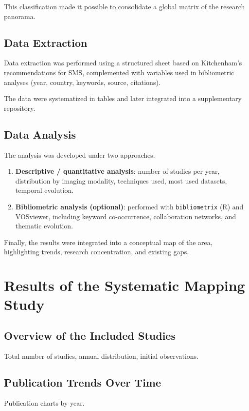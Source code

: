 This classification made it possible to consolidate a global matrix of the research panorama.

\subsection{Data Extraction}
Data extraction was performed using a structured sheet based on Kitchenham's recommendations for SMS, complemented with variables used in bibliometric analyses (year, country, keywords, source, citations).

The data were systematized in tables and later integrated into a supplementary repository.

\subsection{Data Analysis}
The analysis was developed under two approaches:

\begin{enumerate}
    \item \textbf{Descriptive / quantitative analysis}:
    number of studies per year, distribution by imaging modality, techniques used, most used datasets, temporal evolution.
    \item \textbf{Bibliometric analysis (optional)}:
    performed with \texttt{bibliometrix} (R) and VOSviewer, including keyword co-occurrence, collaboration networks, and thematic evolution.
\end{enumerate}

Finally, the results were integrated into a conceptual map of the area, highlighting trends, research concentration, and existing gaps.


\section{Results of the Systematic Mapping Study}

\subsection{Overview of the Included Studies}
Total number of studies, annual distribution, initial observations.

\subsection{Publication Trends Over Time}
Publication charts by year.

